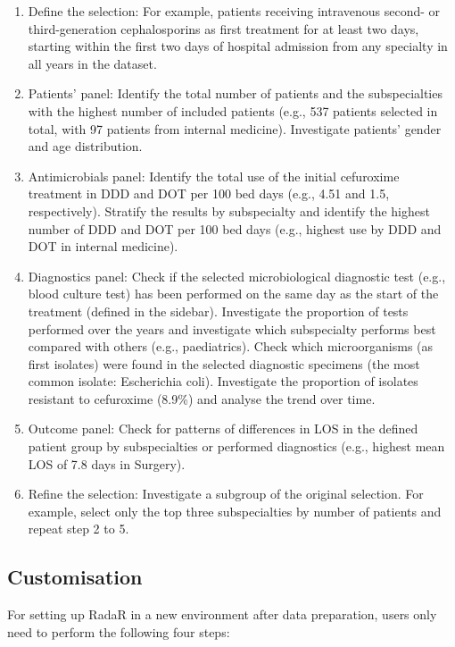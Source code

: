 \documentclass[
]{book}
\providecommand{\tightlist}{%
  \setlength{\itemsep}{0pt}\setlength{\parskip}{0pt}}
\begin{document}
\begin{enumerate}
\def\labelenumi{\arabic{enumi}.}
\tightlist
\item
  Define the selection: For example, patients receiving intravenous second- or third-generation cephalosporins as first treatment for at least two days, starting within the first two days of hospital admission from any specialty in all years in the dataset.
\item
  Patients' panel: Identify the total number of patients and the subspecialties with the highest number of included patients (e.g., 537 patients selected in total, with 97 patients from internal medicine). Investigate patients' gender and age distribution.
\item
  Antimicrobials panel: Identify the total use of the initial cefuroxime treatment in DDD and DOT per 100 bed days (e.g., 4.51 and 1.5, respectively). Stratify the results by subspecialty and identify the highest number of DDD and DOT per 100 bed days (e.g., highest use by DDD and DOT in internal medicine).
\item
  Diagnostics panel: Check if the selected microbiological diagnostic test (e.g., blood culture test) has been performed on the same day as the start of the treatment (defined in the sidebar). Investigate the proportion of tests performed over the years and investigate which subspecialty performs best compared with others (e.g., paediatrics). Check which microorganisms (as first isolates) were found in the selected diagnostic specimens (the most common isolate: Escherichia coli). Investigate the proportion of isolates resistant to cefuroxime (8.9\%) and analyse the trend over time.
\item
  Outcome panel: Check for patterns of differences in LOS in the defined patient group by subspecialties or performed diagnostics (e.g., highest mean LOS of 7.8 days in Surgery).
\item
  Refine the selection: Investigate a subgroup of the original selection. For example, select only the top three subspecialties by number of patients and repeat step 2 to 5.
\end{enumerate}

\hypertarget{customisation}{%
\subsection{Customisation}\label{customisation}}

For setting up RadaR in a new environment after data preparation, users only need to perform the following four steps:
\end{document}

